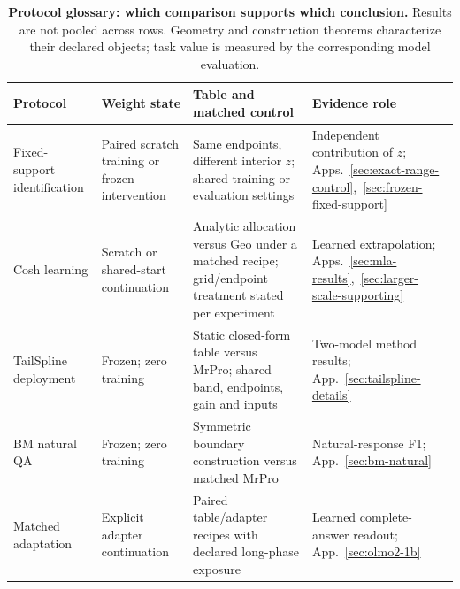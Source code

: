 \begin{table}[!ht]
\centering\small
\setlength{\tabcolsep}{4pt}
\caption{\textbf{Protocol glossary: which comparison supports which conclusion.} Results are not pooled across rows. Geometry and construction theorems characterize their declared objects; task value is measured by the corresponding model evaluation.}
\label{tab:protocol-glossary}\label{tab:evidence-map}
\begin{tabular}{@{}>{\raggedright\arraybackslash}p{.18\linewidth}>{\raggedright\arraybackslash}p{.21\linewidth}>{\raggedright\arraybackslash}p{.32\linewidth}>{\raggedright\arraybackslash}p{.22\linewidth}@{}}
\toprule
Protocol & Weight state & Table and matched control & Evidence role \\
\midrule
Fixed-support identification & Paired scratch training or frozen intervention & Same endpoints, different interior $z$; shared training or evaluation settings & Independent contribution of $z$; Apps.~\ref{sec:exact-range-control},~\ref{sec:frozen-fixed-support} \\
Cosh learning & Scratch or shared-start continuation & Analytic allocation versus Geo under a matched recipe; grid/endpoint treatment stated per experiment & Learned extrapolation; Apps.~\ref{sec:mla-results},~\ref{sec:larger-scale-supporting} \\
TailSpline deployment & Frozen; zero training & Static closed-form table versus MrPro; shared band, endpoints, gain and inputs & Two-model method results; App.~\ref{sec:tailspline-details} \\
BM natural QA & Frozen; zero training & Symmetric boundary construction versus matched MrPro & Natural-response F1; App.~\ref{sec:bm-natural} \\
Matched adaptation & Explicit adapter continuation & Paired table/adapter recipes with declared long-phase exposure & Learned complete-answer readout; App.~\ref{sec:olmo2-1b} \\
\bottomrule
\end{tabular}
\end{table}
\FloatBarrier
